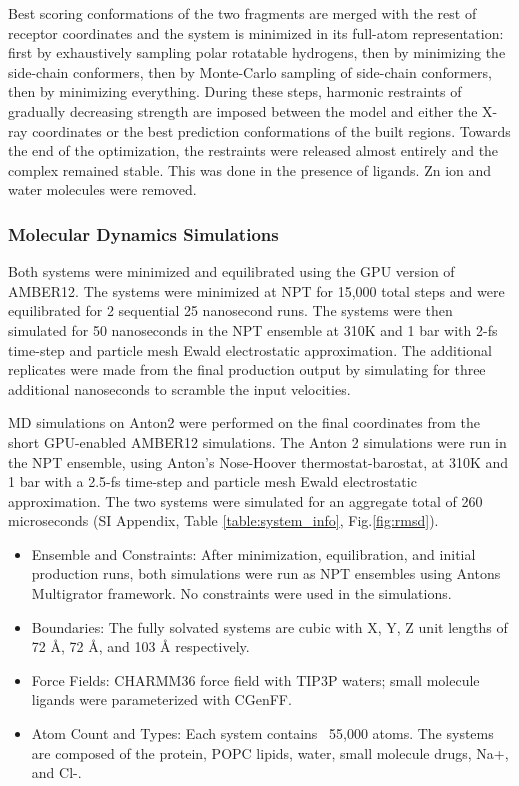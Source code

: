 Best scoring conformations of the two fragments are merged with the rest of receptor coordinates and the system is minimized in its full-atom representation: first by exhaustively sampling polar rotatable hydrogens, then by minimizing the side-chain conformers, then by Monte-Carlo sampling of side-chain conformers, then by minimizing everything. During these steps, harmonic restraints of gradually decreasing strength are imposed between the model and either the X-ray coordinates or the best prediction conformations of the built regions. Towards the end of the optimization, the restraints were released almost entirely and the complex remained stable. This was done in the presence of ligands. Zn ion and water molecules were removed.

\subsubsection{Molecular Dynamics Simulations} Both systems were minimized and equilibrated using the GPU version of AMBER12. The systems were minimized at NPT for 15,000 total steps and were equilibrated for 2 sequential 25 nanosecond runs. The systems were then simulated for 50 nanoseconds in the NPT ensemble at 310K and 1 bar with 2-fs time-step and particle mesh Ewald electrostatic approximation. The additional replicates were made from the final production output by simulating for three additional nanoseconds to scramble the input velocities.

MD simulations on Anton2 were performed on the final coordinates from the short GPU-enabled AMBER12 simulations. The Anton 2 simulations were run in the NPT ensemble, using Anton's Nose-Hoover thermostat-barostat, at 310K and 1 bar with a 2.5-fs time-step and particle mesh Ewald electrostatic approximation. The two systems were simulated for an aggregate total of 260 microseconds (SI Appendix, Table \ref{table:system_info}, Fig.\ref{fig:rmsd}).

\begin{itemize}
  \item Ensemble and Constraints: After minimization, equilibration, and initial production runs, both simulations were run as NPT ensembles using Anton\textquotesingle s Multigrator framework. No constraints were used in the simulations.
  \item Boundaries: The fully solvated systems are cubic with X, Y, Z unit lengths of 72 \si{\angstrom}, 72 \si{\angstrom}, and 103 \si{\angstrom} respectively.
  \item Force Fields: CHARMM36 force field with TIP3P waters; small molecule ligands were parameterized with CGenFF.
  \item Atom Count and Types: Each system contains ~55,000 atoms. The systems are composed of the protein, POPC lipids, water, small molecule drugs, Na+, and Cl-.
\end{itemize}

